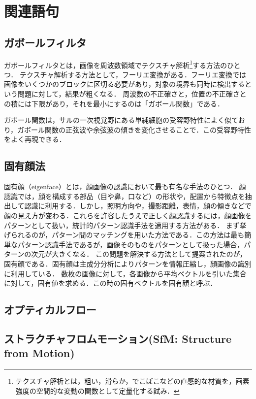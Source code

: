 \chapter{関連語句}
\section{ガボールフィルタ}
ガボールフィルタとは，画像を周波数領域でテクスチャ解析\footnote{テクスチャ解析とは，粗い，滑らか，でこぼこなどの直感的な材質を，画素強度の空間的な変動の関数として定量化する試み\cite{テクスチャ解析}．}する方法のひとつ．
テクスチャ解析する方法として，フーリエ変換がある．フーリエ変換では画像をいくつかのブロックに区切る必要があり，対象の境界も同時に検出するという問題に対して，結果が粗くなる．
周波数の不正確さと，位置の不正確さとの積には下限があり，それを最小にするのは「ガボール関数」である．\par
ガボール関数は，サルの一次視覚野にある単純細胞の受容野特性によく似ており，ガボール関数の正弦波や余弦波の傾きを変化させることで．この受容野特性をよく再現できる．
\begin{flushright}
    \cite[p.144]{認知心理学辞典}
\end{flushright}
\section{固有顔法}
固有顔（eigenface）とは，顔画像の認識において最も有名な手法のひとつ．
顔認識では，顔を構成する部品（目や鼻，口など）の形状や，配置から特徴点を抽出して認識に利用する．しかし，照明方向や，撮影距離，表情，顔の傾きなどで顔の見え方が変わる．これらを許容したうえで正しく顔認識するには，顔画像をパターンとして扱い，統計的パターン認識手法を適用する方法がある．
まず挙げられるのが，パターン間のマッチングを用いた方法である．この方法は最も簡単なパターン認識手法であるが，画像そのものをパターンとして扱った場合，パターンの次元が大きくなる．
この問題を解決する方法として提案されたのが，固有顔である．固有顔は主成分分析によりパターンを情報圧縮し，顔画像の識別に利用している．
数枚の画像に対して，各画像から平均ベクトルを引いた集合に対して，固有値を求める．この時の固有ベクトルを固有顔と呼ぶ．\par
\hfill\cite{顔画像からの個人識別}
\section{オプティカルフロー}
\section{ストラクチャフロムモーション(SfM: Structure from Motion)}

